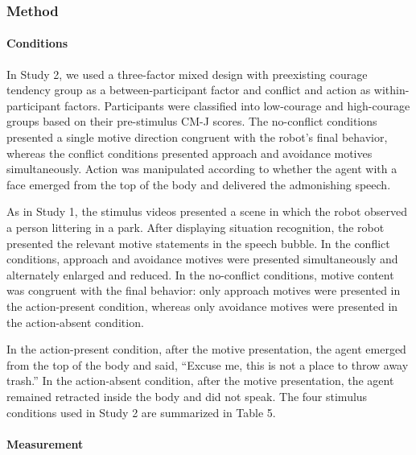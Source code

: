 \subsubsection{Method}\label{method-1}

\paragraph{Conditions}\label{conditions-1}

In Study 2, we used a three-factor mixed design with preexisting courage
tendency group as a between-participant factor and conflict and action
as within-participant factors. Participants were classified into
low-courage and high-courage groups based on their pre-stimulus CM-J
scores. The no-conflict conditions presented a single motive direction
congruent with the robot's final behavior, whereas the conflict
conditions presented approach and avoidance motives simultaneously.
Action was manipulated according to whether the agent with a face
emerged from the top of the body and delivered the admonishing speech.

As in Study 1, the stimulus videos presented a scene in which the robot
observed a person littering in a park. After displaying situation
recognition, the robot presented the relevant motive statements in the
speech bubble. In the conflict conditions, approach and avoidance
motives were presented simultaneously and alternately enlarged and
reduced. In the no-conflict conditions, motive content was congruent
with the final behavior: only approach motives were presented in the
action-present condition, whereas only avoidance motives were presented
in the action-absent condition.

In the action-present condition, after the motive presentation, the
agent emerged from the top of the body and said, ``Excuse me, this is
not a place to throw away trash.'' In the action-absent condition, after
the motive presentation, the agent remained retracted inside the body
and did not speak. The four stimulus conditions used in Study 2 are
summarized in Table 5.

\paragraph{Measurement}\label{measurement-1}

